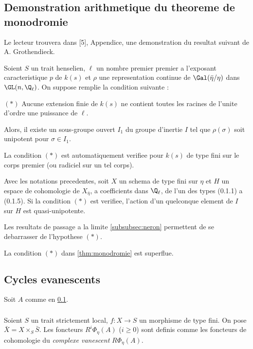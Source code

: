 \subsection{Demonstration arithmetique du theoreme de monodromie}
\label{subsec:demo-arith-monodromie}

Le lecteur trouvera dans [5], Appendice, une demonstration du resultat suivant de A. Grothendieck.

\begin{proposition}
\label{prop:1.1}
Soient $S$ un trait henselien, $\ell$ un nombre premier premier a l'exposant caracteristique $p$ de $k(s)$ et $\rho$ une representation continue de $\Gal(\bar{\eta}/\eta)$ dans $\GL(n, \Q_\ell)$. On suppose remplie la condition suivante :

$(*)$ Aucune extension finie de $k(s)$ ne contient toutes les racines de l'unite d'ordre une puissance de $\ell$.

Alors, il existe un sous-groupe ouvert $I_1$ du groupe d'inertie $I$ tel que $\rho(\sigma)$ soit unipotent pour $\sigma \in I_1$.
\end{proposition}

La condition $(*)$ est automatiquement verifiee pour $k(s)$ de type fini sur le corps premier (ou radiciel sur un tel corps).

\begin{theorem}
\label{thm:monodromie}
Avec les notations precedentes, soit $X$ un schema de type fini sur $\eta$ et $H$ un espace de cohomologie de $X_{\bar{\eta}}$, a coefficients dans $\Q_\ell$, de l'un des types (0.1.1) a (0.1.5). Si la condition $(*)$ est verifiee, l'action d'un quelconque element de $I$ sur $H$ est quasi-unipotente.
\end{theorem}

Les resultats de passage a la limite \ref{subsubsec:neron} permettent de se debarrasser de l'hypothese $(*)$.

\begin{variante}
\label{var:1.3}
La condition $(*)$ dans \ref{thm:monodromie} est superflue.
\end{variante}

\subsection{Cycles evanescents}
\label{subsec:cycles-evanescents}

Soit $A$ comme en \ref{subsec:demo-arith-monodromie}.

\subsubsection{}
\label{subsubsec:2.1}
Soient $S$ un trait strictement local, $f: X \to S$ un morphisme de type fini. On pose $\bar{X} = X \times_S \bar{S}$. Les foncteurs $R^i \Phi_\eta(A)$ ($i \geqslant 0$) sont definis comme les foncteurs de cohomologie du \emph{complexe vanescent} $R\Phi_\eta(A)$.

